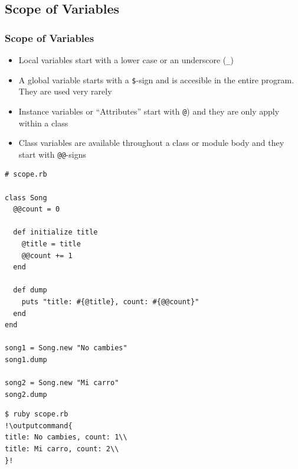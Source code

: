 \documentclass{beamer}
\newcommand{\outputcommand}[1]{\color{darkgreen}{#1}}
\begin{document}
\subsection{Scope of Variables}
\begin{frame}
\frametitle{Scope of Variables}
\begin{itemize}
 \item Local variables start with a lower case or an underscore (\texttt{\_})
 \item A global variable starts with a \texttt{\$}-sign and is accesible in the entire program. They are used very rarely
 \item Instance variables or ``Attributes'' start with \texttt{@}) and they are only apply within a class
 \item Class variables are available throughout a class or module body and they start with  \texttt{@@}-signs
\end{itemize}
\lstset{language=Ruby, style=eclipse}
\begin{lstlisting}[escapechar=&]
# scope.rb

class Song
  @@count = 0

  def initialize title
    @title = title
    @@count += 1
  end

  def dump
    puts "title: #{@title}, count: #{@@count}"
  end
end

song1 = Song.new "No cambies"
song1.dump

song2 = Song.new "Mi carro"
song2.dump
\end{lstlisting}
\lstset{language=shell}
\begin{lstlisting}[numbers=none, escapechar=!]
$ ruby scope.rb 
!\outputcommand{
title: No cambies, count: 1\\
title: Mi carro, count: 2\\
}!
\end{lstlisting}
\end{frame}
\end{document}
